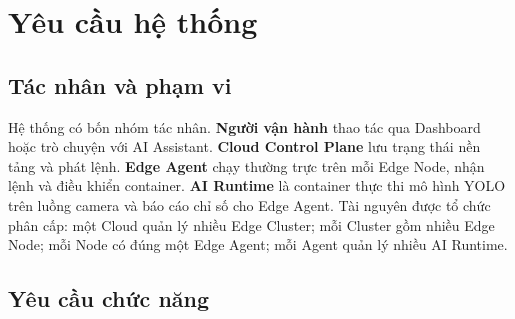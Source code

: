 \section{Yêu cầu hệ thống}

\subsection{Tác nhân và phạm vi}

Hệ thống có bốn nhóm tác nhân. \textbf{Người vận hành} thao tác qua Dashboard
hoặc trò chuyện với AI Assistant. \textbf{Cloud Control Plane} lưu trạng thái nền
tảng và phát lệnh. \textbf{Edge Agent} chạy thường trực trên mỗi Edge Node, nhận
lệnh và điều khiển container. \textbf{AI Runtime} là container thực thi mô hình
YOLO trên luồng camera và báo cáo chỉ số cho Edge Agent. Tài nguyên được tổ
chức phân cấp: một Cloud quản lý nhiều Edge Cluster; mỗi Cluster gồm nhiều Edge
Node; mỗi Node có đúng một Edge Agent; mỗi Agent quản lý nhiều AI Runtime.

\subsection{Yêu cầu chức năng}

